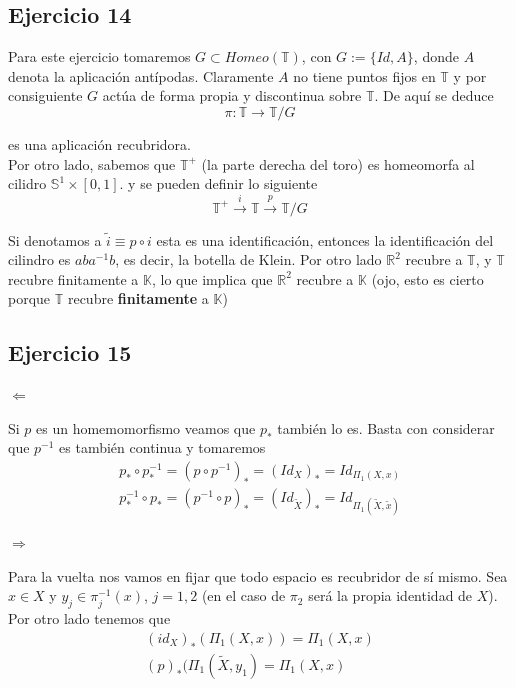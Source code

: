 \documentclass{article}
\begin{document}
\subsection{Ejercicio 14}
Para este ejercicio tomaremos $G\subset Homeo(\mathbb{T})$, con $G:=\{Id, A\}$, donde $A$ denota la aplicación antípodas. Claramente $A$ no tiene puntos fijos en $\mathbb{T}$ y por consiguiente $G$ actúa de forma propia y discontinua sobre $\mathbb{T}$. De aquí se deduce
\begin{equation*}
\pi:\mathbb{T}\rightarrow \mathbb{T}/G
\end{equation*}

es una aplicación recubridora.\\

Por otro lado, sabemos que $\mathbb{T}^+$ (la parte derecha del toro) es homeomorfa al cilidro $\mathbb{S}^1\times [0,1]$. y se pueden definir lo siguiente
\begin{equation*}
\mathbb{T}^+\xrightarrow{i} \mathbb{T}\xrightarrow{p}\mathbb{T}/G
\end{equation*}

Si denotamos a $\tilde{i}\equiv p\circ i$ esta es una identificación, entonces la identificación del cilindro es $aba^{-1}b$, es decir, la botella de Klein. Por otro lado $\mathbb{R}^2$ recubre a $\mathbb{T}$, y $\mathbb{T}$ recubre finitamente a $\mathbb{K}$, lo que implica que $\mathbb{R}^2$ recubre a $\mathbb{K}$ (ojo, esto es cierto porque $\mathbb{T}$ recubre \textbf{finitamente} a $\mathbb{K}$)

\subsection{Ejercicio 15}
$\Leftarrow$

Si $p$ es un homemomorfismo veamos que $p_*$ también lo es. Basta con considerar que $p^{-1}$ es también continua y tomaremos
\begin{gather*}
p_*\circ p^{-1}_*=(p\circ p^{-1})_*=(Id_X)_*=Id_{\Pi_1(X,x)}\\
p^{-1}_*\circ p_*=(p^{-1}\circ p)_*=(Id_{\tilde{X}})_*=Id_{\Pi_1(\tilde{X},\tilde{x})}
\end{gather*}

$\Rightarrow$

Para la vuelta nos vamos en fijar que todo espacio es recubridor de sí mismo. Sea $x\in X$ y $y_j\in \pi_j^{-1}(x)$, $j=1,2$ (en el caso de $\pi_2$ será la propia identidad de $X$). Por otro lado tenemos que
\begin{gather*}
(id_X)_*(\Pi_1(X,x))=\Pi_1(X,x)\\
(p)_*(\Pi_1(\tilde{X},y_1)=\Pi_1(X,x)
\end{gather*}
\end{document}
